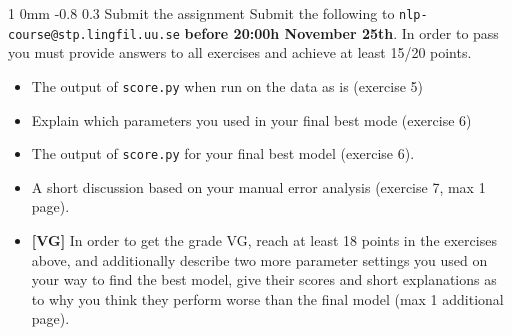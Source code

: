 \documentclass[11pt]{article}
\makeatletter
\newcommand{\newsec}[2]{\section{#1}\label{sec:#2}\noindent}
\renewcommand{\section}{\@startsection
{section}%
{1}%
{0mm}%
{-0.8\baselineskip}%
{0.3\baselineskip}%
{\bfseries\large}}%
\makeatother
\begin{document}
\newsec{Submit the assignment}{submit}%
Submit the following to {\tt nlp-course@stp.lingfil.uu.se} \textbf{before 20:00h November 25th}. In order to pass you must provide answers to all exercises and achieve at least 15/20 points.
\begin{itemize}[noitemsep,topsep=0.2cm]
\item The output of {\tt score.py} when run on the data as is (exercise 5)
\item Explain which parameters you used in your final best mode (exercise 6)
\item The output of {\tt score.py} for your final best model (exercise 6).
\item A short discussion based on your manual error analysis (exercise 7, max 1 page).
\item \textbf{[VG]} In order to get the grade VG, reach at least 18 points in the exercises above, and additionally describe two more parameter settings you used on your way to find the best model, give their scores and short explanations as to why you think they perform worse than the final model (max 1 additional page).
\end{itemize}
\end{document}
